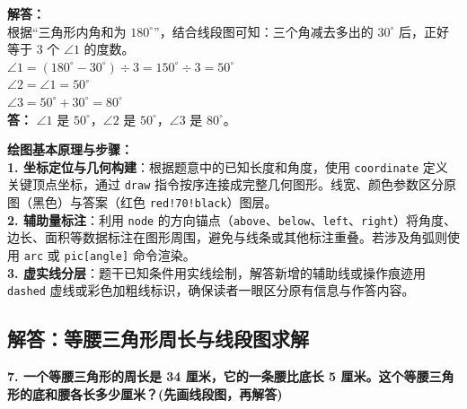 \vspace{0.6cm}
\textbf{解答：}\\
根据“三角形内角和为 $180^\circ$”，结合线段图可知：三个角减去多出的 $30^\circ$ 后，正好等于 $3$ 个 $\angle 1$ 的度数。\\
\indent $\angle 1 = (180^\circ - 30^\circ) \div 3 = 150^\circ \div 3 = 50^\circ$ \\
\indent $\angle 2 = \angle 1 = 50^\circ$ \\
\indent $\angle 3 = 50^\circ + 30^\circ = 80^\circ$ \\

\vspace{0.2cm}
\noindent\textbf{答：} $\angle 1$ 是 $50^\circ$，$\angle 2$ 是 $50^\circ$，$\angle 3$ 是 $80^\circ$。


\vspace{0.6cm}

{\small\color{blue!70!black}
\textbf{绘图基本原理与步骤：}\\
\textbf{1. 坐标定位与几何构建}：根据题意中的已知长度和角度，使用 \texttt{coordinate} 定义关键顶点坐标，通过 \texttt{draw} 指令按序连接成完整几何图形。线宽、颜色参数区分原图（黑色）与答案（红色 \texttt{red!70!black}）图层。\\
\textbf{2. 辅助量标注}：利用 \texttt{node} 的方向锚点（\texttt{above}、\texttt{below}、\texttt{left}、\texttt{right}）将角度、边长、面积等数据标注在图形周围，避免与线条或其他标注重叠。若涉及角弧则使用 \texttt{arc} 或 \texttt{pic[angle]} 命令渲染。\\
\textbf{3. 虚实线分层}：题干已知条件用实线绘制，解答新增的辅助线或操作痕迹用 \texttt{dashed} 虚线或彩色加粗线标识，确保读者一眼区分原有信息与作答内容。
}

\newpage

\newpage

\subsection{解答：等腰三角形周长与线段图求解}

\vspace{0.4cm}

\noindent\textbf{7. 一个等腰三角形的周长是 34 厘米，它的一条腰比底长 5 厘米。这个等腰三角形的底和腰各长多少厘米？(先画线段图，再解答)}

\vspace{0.8cm}

